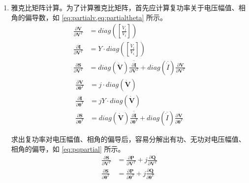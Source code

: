 \documentclass[a4paper,12pt]{article}
\newcommand{\vect}[1]{\boldsymbol{#1}}
\begin{document}
\begin{enumerate}
\begin{lstlisting}[style=Matlab-editor,basicstyle=\mlttfamily]
      \end{lstlisting}
      \item 雅克比矩阵计算。为了计算雅克比矩阵，首先应计算复功率关于电压幅值、相角的偏导数，如 \cref{eq:partialv,eq:partialtheta} 所示。
      \begin{equation}
        \label{eq:partialv}
        \begin{aligned}
          \frac{\partial \vect{\dot{V}}}{\partial \vect{V}^T}&=diag(\left[\frac{\dot{V}_i}{V_i}\right])\\
          \frac{\partial \vect{\dot{I}}}{\partial \vect{V}^T}&=Y\cdot diag(\left[\frac{\dot{V}_i}{V_i}\right])\\
          \frac{\partial \vect{S}}{\partial \vect{V}^T} &=diag(\vect{\dot{V}})\overline{\frac{\partial \vect{\dot{I}}}{\partial \vect{V}^T}} + diag(\overline{\dot{I}})\frac{\partial \vect{\dot{V}}}{\partial \vect{V}^T}
        \end{aligned}
      \end{equation}
      \begin{equation}
        \label{eq:partialtheta}
        \begin{aligned}
          \frac{\partial \vect{\dot{V}}}{\partial \vect{\theta}^T}&=j\cdot diag(\vect{\dot{V}})\\
          \frac{\partial \vect{\dot{I}}}{\partial \vect{\theta}^T}&=jY\cdot diag(\vect{\dot{V}})\\
          \frac{\partial \vect{S}}{\partial \vect{\theta}^T} &=diag(\vect{\dot{V}})\overline{\frac{\partial \vect{\dot{I}}}{\partial \vect{\theta}^T}} + diag(\overline{\dot{I}})\frac{\partial \vect{\dot{V}}}{\partial \vect{\theta}^T}
        \end{aligned}
      \end{equation}

      求出复功率对电压幅值、相角的偏导后，容易分解出有功、无功对电压幅值、相角的偏导，如 \cref{eq:pqpartial} 所示。
      \begin{equation}
        \label{eq:pqpartial}
        \begin{aligned}
          \frac{\partial \vect{S}}{\partial \vect{V}^T} &= \frac{\partial \vect{P}}{\partial \vect{V}^T} + j \frac{\partial \vect{Q}}{\partial \vect{V}^T}\\
          \frac{\partial \vect{S}}{\partial \vect{\theta}^T} &= \frac{\partial \vect{P}}{\partial \vect{\theta}^T} + j \frac{\partial \vect{Q}}{\partial \vect{\theta}^T}\\
        \end{aligned}
      \end{equation}


\end{enumerate}
\end{document}
